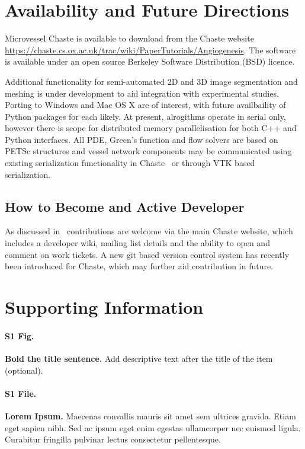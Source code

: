 \documentclass[10pt,letterpaper]{article}
\begin{document}
\section*{Availability and Future Directions}

Microvessel Chaste is available to download from the Chaste website  \url{https://chaste.cs.ox.ac.uk/trac/wiki/PaperTutorials/Angiogenesis}. The software is available under an open source Berkeley Software Distribution (BSD) licence. 

Additional functionality for semi-automated 2D and 3D image segmentation and meshing is under development to aid integration with experimental studies. Porting to Windows and Mac OS X are of interest, with future availbaility of Python packages for each likely. At present, alrogithms operate in serial only, however there is scope for distributed memory parallelisation for both C++ and Python interfaces. All PDE, Green's function and flow solvers are based on PETSc structures and vessel network components may be communicated using existing serialization functionality in Chaste~\cite{Harvey} or through VTK based serialization.

\subsection*{How to Become and Active Developer}

As discussed in~\cite{Mirams2013} contributions are welcome via the main Chaste website, which includes a developer wiki, mailing list details and the ability to open and comment on work tickets. A new git based version control system has recently been introduced for Chaste, which may further aid contribution in future.


\section*{Supporting Information}

\paragraph*{S1 Fig.}
\label{S1_Fig}
{\bf Bold the title sentence.} Add descriptive text after the title of the item (optional).

\paragraph*{S1 File.}
\label{S1_File}
{\bf Lorem Ipsum.}  Maecenas convallis mauris sit amet sem ultrices gravida. Etiam eget sapien nibh. Sed ac ipsum eget enim egestas ullamcorper nec euismod ligula. Curabitur fringilla pulvinar lectus consectetur pellentesque.
\end{document}
